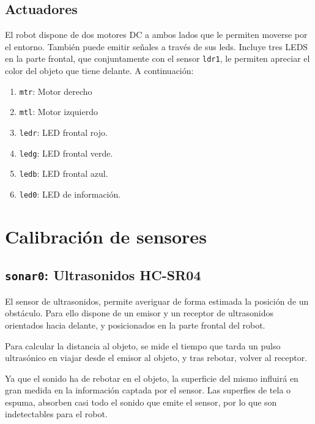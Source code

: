 \documentclass[10pt,a4paper,hidelinks,twocolumn]{article}
\begin{document}
\subsection{Actuadores}
El robot dispone de dos motores DC a ambos lados que le permiten moverse por el 
entorno. También puede emitir señales a través de sus leds. Incluye tres LEDS en 
la parte frontal, que conjuntamente con el sensor \texttt{ldr1}, le permiten 
apreciar el color del objeto que tiene delante. A continuación:
\begin{enumerate}
	\setlength{\parskip}{0cm}

	\item \texttt{mtr}: Motor derecho
	\item \texttt{mtl}: Motor izquierdo
	\item \texttt{ledr}: LED frontal rojo.
	\item \texttt{ledg}: LED frontal verde.
	\item \texttt{ledb}: LED frontal azul.
	\item \texttt{led0}: LED de información.
\end{enumerate}


\section{Calibración de sensores}
\subsection{\texttt{sonar0}: Ultrasonidos HC-SR04}

El sensor de ultrasonidos, permite averiguar de forma estimada la posición de un 
obstáculo. Para ello dispone de un emisor y un receptor de ultrasonidos 
orientados hacia delante, y posicionados en la parte frontal del robot.

Para calcular la distancia al objeto, se mide el tiempo que tarda un pulso 
ultrasónico en viajar desde el emisor al objeto, y tras rebotar, volver al 
receptor.

Ya que el sonido ha de rebotar en el objeto, la superficie del mismo influirá en 
gran medida en la información captada por el sensor. Las superfies de tela o 
espuma, absorben casi todo el sonido que emite el sensor, por lo que son 
indetectables para el robot.
\end{document}

